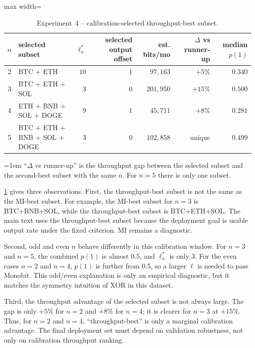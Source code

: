 \documentclass[11pt,titlepage,openany,oneside]{book}  %
\newcommand{\floatnote}[1]{%
  \par\smallskip\noindent%
  \begin{minipage}{\linewidth}%
    \footnotesize\emergencystretch=1em #1%
  \end{minipage}\par%
}
\begin{document}
\begin{table}[!htbp]
  \caption{Experiment~4 -- calibration-selected throughput-best subset.}
  \label{tab:exp4-calibration}
  \begin{center}
    \begin{adjustbox}{max width=\textwidth}
    \begin{tabular}{clrrrrr}
      \toprule
      $n$ & selected subset & $\ell^*_n$ & selected output offset & est. bits/mo & $\Delta$ vs runner-up & median $p(1)$ \\
      \midrule
      2 & BTC + ETH                 & $10$ & $1$ & $97{,}163$  & $+5\%$  & $0.340$ \\
      3 & BTC + ETH + SOL           & $3$  & $0$ & $201{,}950$ & $+15\%$ & $0.500$ \\
      4 & ETH + BNB + SOL + DOGE    & $9$  & $1$ & $45{,}711$  & $+8\%$  & $0.281$ \\
      5 & BTC + ETH + BNB + SOL + DOGE & $3$ & $0$ & $102{,}858$ & unique & $0.499$ \\
      \bottomrule
    \end{tabular}
    \end{adjustbox}
  \end{center}
  \floatnote{``$\Delta$ vs runner-up'' is the throughput gap between the selected subset and the second-best subset with the same $n$. For $n=5$ there is only one subset.}
\end{table}

\cref{tab:exp4-calibration} gives three observations. First, the throughput-best subset is not the same as the MI-best subset. For example, the MI-best subset for $n=3$ is BTC+BNB+SOL, while the throughput-best subset is BTC+ETH+SOL. The main text uses the throughput-best subset because the deployment goal is usable output rate under the fixed criterion. MI remains a diagnostic.

Second, odd and even $n$ behave differently in this calibration window. For $n=3$ and $n=5$, the combined $p(1)$ is almost $0.5$, and $\ell^*_n$ is only 3. For the even cases $n=2$ and $n=4$, $p(1)$ is further from $0.5$, so a larger $\ell$ is needed to pass Monobit. This odd/even explanation is only an empirical diagnostic, but it matches the symmetry intuition of XOR in this dataset.

Third, the throughput advantage of the selected subset is not always large. The gap is only $+5\%$ for $n=2$ and $+8\%$ for $n=4$; it is clearer for $n=3$ at $+15\%$. Thus, for $n=2$ and $n=4$, ``throughput-best'' is only a marginal calibration advantage. The final deployment set must depend on validation robustness, not only on calibration throughput ranking.
\end{document}
